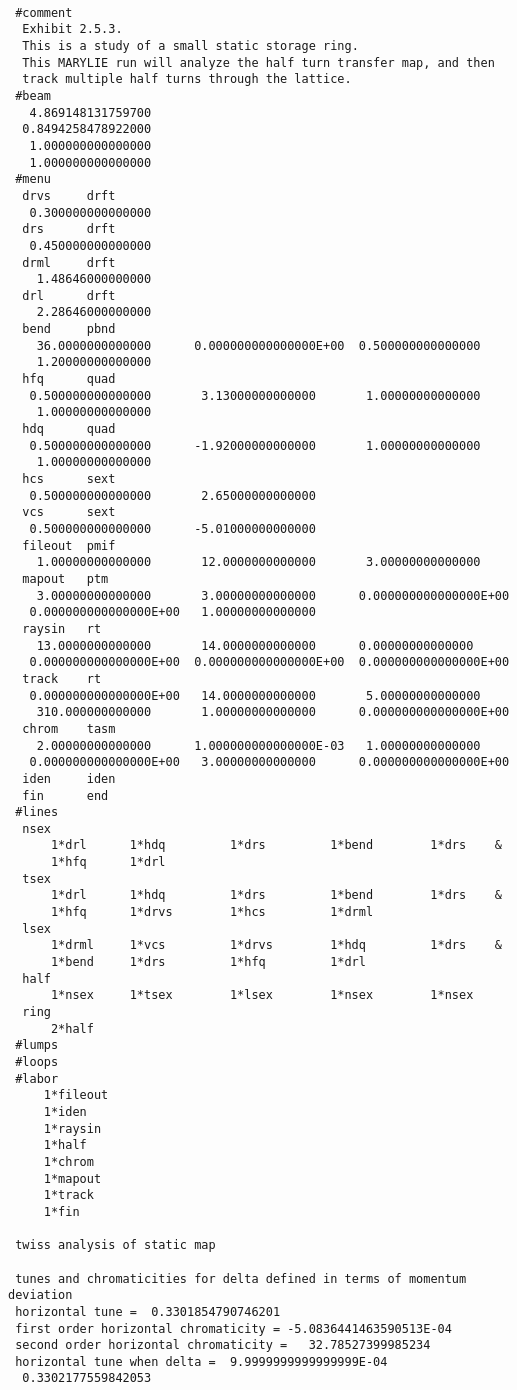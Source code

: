 {
\footnotesize\tt
\begin{verbatim}
 #comment
  Exhibit 2.5.3.
  This is a study of a small static storage ring.
  This MARYLIE run will analyze the half turn transfer map, and then
  track multiple half turns through the lattice.
 #beam
   4.869148131759700
  0.8494258478922000
   1.000000000000000
   1.000000000000000
 #menu
  drvs     drft
   0.300000000000000
  drs      drft
   0.450000000000000
  drml     drft
    1.48646000000000
  drl      drft
    2.28646000000000
  bend     pbnd
    36.0000000000000      0.000000000000000E+00  0.500000000000000
    1.20000000000000
  hfq      quad
   0.500000000000000       3.13000000000000       1.00000000000000
    1.00000000000000
  hdq      quad
   0.500000000000000      -1.92000000000000       1.00000000000000
    1.00000000000000
  hcs      sext
   0.500000000000000       2.65000000000000
  vcs      sext
   0.500000000000000      -5.01000000000000
  fileout  pmif
    1.00000000000000       12.0000000000000       3.00000000000000
  mapout   ptm
    3.00000000000000       3.00000000000000      0.000000000000000E+00
   0.000000000000000E+00   1.00000000000000
  raysin   rt
    13.0000000000000       14.0000000000000      0.00000000000000
   0.000000000000000E+00  0.000000000000000E+00  0.000000000000000E+00
  track    rt
   0.000000000000000E+00   14.0000000000000       5.00000000000000
    310.000000000000       1.00000000000000      0.000000000000000E+00
  chrom    tasm
    2.00000000000000      1.000000000000000E-03   1.00000000000000
   0.000000000000000E+00   3.00000000000000      0.000000000000000E+00
  iden     iden
  fin      end
 #lines
  nsex
      1*drl      1*hdq         1*drs         1*bend        1*drs    &
      1*hfq      1*drl
  tsex
      1*drl      1*hdq         1*drs         1*bend        1*drs    &
      1*hfq      1*drvs        1*hcs         1*drml
  lsex
      1*drml     1*vcs         1*drvs        1*hdq         1*drs    &
      1*bend     1*drs         1*hfq         1*drl
  half
      1*nsex     1*tsex        1*lsex        1*nsex        1*nsex
  ring
      2*half
 #lumps
 #loops
 #labor
     1*fileout
     1*iden
     1*raysin
     1*half
     1*chrom
     1*mapout
     1*track
     1*fin

 twiss analysis of static map

 tunes and chromaticities for delta defined in terms of momentum deviation
 horizontal tune =  0.3301854790746201
 first order horizontal chromaticity = -5.0836441463590513E-04
 second order horizontal chromaticity =   32.78527399985234
 horizontal tune when delta =  9.9999999999999999E-04
  0.3302177559842053


\end{verbatim}}
